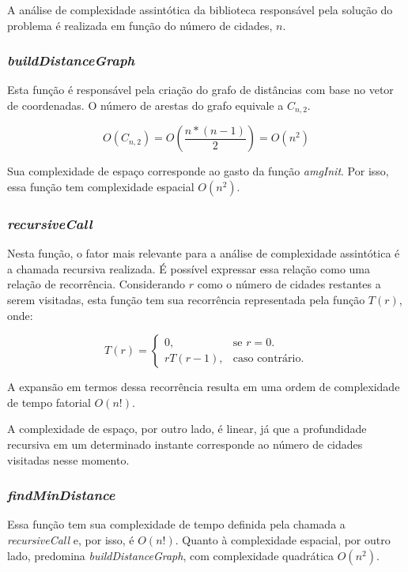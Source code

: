 \documentclass[10pt,a4paper]{article}
\numberwithin{equation}{section}
\begin{document}
A análise de complexidade assintótica da biblioteca responsável pela solução do problema é realizada em função do número de cidades, $n$.

\subsubsection{\emph{buildDistanceGraph}}

Esta função é responsável pela criação do grafo de distâncias com base no vetor de coordenadas. O número de arestas do grafo equivale a $C_{n,2}$.

\begin{equation}
    O(C_{n,2}) = O(\frac{n*(n-1)}{2}) = O(n^2)
\end{equation}

Sua complexidade de espaço corresponde ao gasto da função \emph{amgInit}. Por isso, essa função tem complexidade espacial $O(n^2)$.

\subsubsection{\emph{recursiveCall}}

Nesta função, o fator mais relevante para a análise de complexidade assintótica é a chamada recursiva realizada. É possível expressar essa relação como uma relação de recorrência. Considerando $r$ como o número de cidades restantes a serem visitadas, esta função tem sua recorrência representada pela função $T(r)$, onde:

\begin{equation}
    T(r)=\begin{cases}
        0, & \text{se $r = 0$.}\\
        rT(r-1), & \text{caso contrário.} 
    \end{cases}
\end{equation}

A expansão em termos dessa recorrência resulta em uma ordem de complexidade de tempo fatorial $O(n!)$.

A complexidade de espaço, por outro lado, é linear, já que a profundidade recursiva em um determinado instante corresponde ao número de cidades visitadas nesse momento.

\subsubsection{\emph{findMinDistance}}

Essa função tem sua complexidade de tempo definida pela chamada a \emph{recursiveCall} e, por isso, é $O(n!)$. Quanto à complexidade espacial, por outro lado, predomina \emph{buildDistanceGraph}, com complexidade quadrática $O(n^2)$. 
\end{document}
